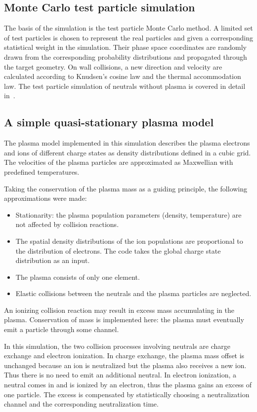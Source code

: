 \documentclass[a4paper,twoside,12pt]{article}
\begin{document}
\subsection{Monte Carlo test particle simulation}
The basis of the simulation is the test particle Monte Carlo method. A limited set of test particles is chosen to represent the real particles and given a corresponding statistical weight in the simulation. Their phase space coordinates are randomly drawn from the corresponding probability distributions and propagated through the target geometry. On wall collisions, a new direction and velocity are calculated according to Knudsen's cosine law and the thermal accommodation law. The test particle simulation of neutrals without plasma is covered in detail in~\cite{kapanen:bsc}.

\subsection{A simple quasi-stationary plasma model}
The plasma model implemented in this simulation describes the plasma electrons and ions of different charge states as density distributions defined in a cubic grid. The velocities of the plasma particles are approximated as Maxwellian with predefined temperatures.

Taking the conservation of the plasma mass as a guiding principle, the following approximations were made:
\begin{itemize}
    \item Stationarity: the plasma population parameters (density, temperature) are not affected by collision reactions.
    \item The spatial density distributions of the ion populations are
        proportional to the distribution of electrons. The code takes the
        global charge state distribution as an input.
    \item The plasma consists of only one element.
    \item Elastic collisions between the neutrals and the plasma particles are neglected.
\end{itemize}

An ionizing collision reaction may result in excess mass accumulating in the plasma. Conservation of mass is implemented here: the plasma must eventually emit a particle through some channel.

In this simulation, the two collision processes involving neutrals are charge exchange and electron ionization. In charge exchange, the plasma mass offset is unchanged because an ion is neutralized but the plasma also receives a new ion. Thus there is no need to emit an additional neutral. In electron ionization, a neutral comes in and is ionized by an electron, thus the plasma gains an excess of one particle. The excess is compensated by statistically choosing a neutralization channel and the corresponding neutralization time.
\end{document}
